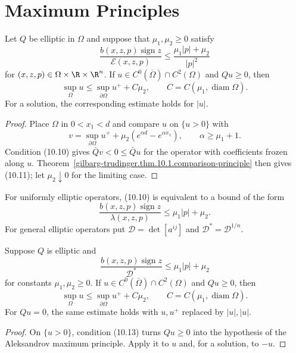 \section{Maximum Principles}

\begin{theorem}
\label{gilbarg-trudinger.thm.10.3.apriori-bound}
Let $Q$ be elliptic in $\Omega$ and suppose that $\mu_1,\mu_2\ge0$ satisfy
\begin{equation}
\frac{b(x,z,p)\operatorname{sign}z}{\mathcal E(x,z,p)}
\le\frac{\mu_1|p|+\mu_2}{|p|^2}
\tag{10.10}
\end{equation}
for $(x,z,p)\in\Omega\times\R\times\R^n$.  If
$u\in C^0(\overline\Omega)\cap C^2(\Omega)$ and $Qu\ge0$, then
\begin{equation}
\sup_\Omega u\le\sup_{\partial\Omega}u^++C\mu_2,
\qquad C=C(\mu_1,\operatorname{diam}\Omega).
\tag{10.11}
\end{equation}
For a solution, the corresponding estimate holds for $|u|$.
\end{theorem}
\begin{proof}
\sketch Place $\Omega$ in $0<x_1<d$ and compare $u$ on $\{u>0\}$ with
\[
v=\sup_{\partial\Omega}u^+
+\mu_2(e^{\alpha d}-e^{\alpha x_1}),\qquad \alpha\ge\mu_1+1.
\]
Condition \textup{(10.10)} gives $\bar Qv<0\le\bar Qu$ for the operator
with coefficients frozen along $u$.  Theorem~\ref{gilbarg-trudinger.thm.10.1.comparison-principle}
then gives \textup{(10.11)}; let $\mu_2\downarrow0$ for the limiting case.
\end{proof}

For uniformly elliptic operators, \textup{(10.10)} is equivalent to a bound
of the form
\begin{equation}
\frac{b(x,z,p)\operatorname{sign}z}{\lambda(x,z,p)}
\le\mu_1|p|+\mu_2.
\tag{10.12}
\end{equation}
For general elliptic operators put
$\mathscr D=\det[a^{ij}]$ and $\mathscr D^*=\mathscr D^{1/n}$.

\begin{theorem}
\label{gilbarg-trudinger.thm.10.4.aleksandrov-type-bound}
Suppose $Q$ is elliptic and
\begin{equation}
\frac{b(x,z,p)\operatorname{sign}z}{\mathscr D^*}
\le\mu_1|p|+\mu_2
\tag{10.13}
\end{equation}
for constants $\mu_1,\mu_2\ge0$.  If
$u\in C^0(\overline\Omega)\cap C^2(\Omega)$ and $Qu\ge0$, then
\begin{equation}
\sup_\Omega u\le\sup_{\partial\Omega}u^++C\mu_2,
\qquad C=C(\mu_1,\operatorname{diam}\Omega).
\tag{10.14}
\end{equation}
For $Qu=0$, the same estimate holds with $u,u^+$ replaced by
$|u|,|u|$.
\end{theorem}
\begin{proof}
\sketch On $\{u>0\}$, condition \textup{(10.13)} turns $Qu\ge0$ into
the hypothesis of the Aleksandrov maximum principle.  Apply it to $u$ and,
for a solution, to $-u$.
\end{proof}

